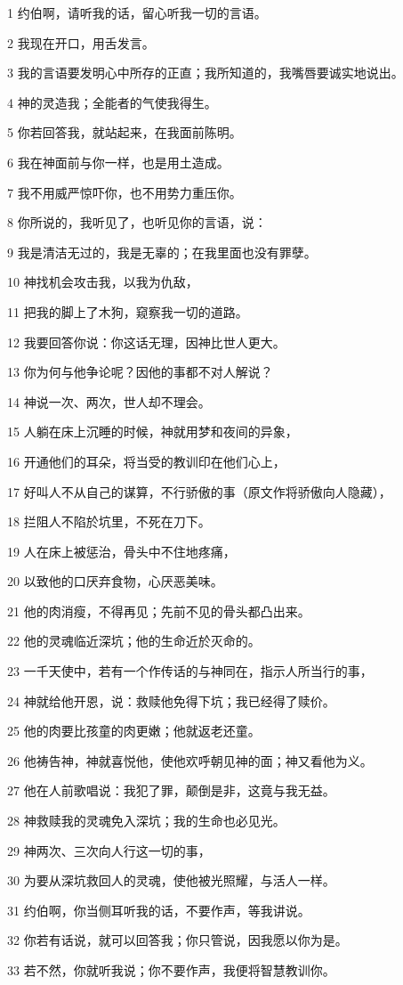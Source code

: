 \par 1 约伯啊，请听我的话，留心听我一切的言语。
\par 2 我现在开口，用舌发言。
\par 3 我的言语要发明心中所存的正直；我所知道的，我嘴唇要诚实地说出。
\par 4 神的灵造我；全能者的气使我得生。
\par 5 你若回答我，就站起来，在我面前陈明。
\par 6 我在神面前与你一样，也是用土造成。
\par 7 我不用威严惊吓你，也不用势力重压你。
\par 8 你所说的，我听见了，也听见你的言语，说：
\par 9 我是清洁无过的，我是无辜的；在我里面也没有罪孽。
\par 10 神找机会攻击我，以我为仇敌，
\par 11 把我的脚上了木狗，窥察我一切的道路。
\par 12 我要回答你说：你这话无理，因神比世人更大。
\par 13 你为何与他争论呢？因他的事都不对人解说？
\par 14 神说一次、两次，世人却不理会。
\par 15 人躺在床上沉睡的时候，神就用梦和夜间的异象，
\par 16 开通他们的耳朵，将当受的教训印在他们心上，
\par 17 好叫人不从自己的谋算，不行骄傲的事（原文作将骄傲向人隐藏），
\par 18 拦阻人不陷於坑里，不死在刀下。
\par 19 人在床上被惩治，骨头中不住地疼痛，
\par 20 以致他的口厌弃食物，心厌恶美味。
\par 21 他的肉消瘦，不得再见；先前不见的骨头都凸出来。
\par 22 他的灵魂临近深坑；他的生命近於灭命的。
\par 23 一千天使中，若有一个作传话的与神同在，指示人所当行的事，
\par 24 神就给他开恩，说：救赎他免得下坑；我已经得了赎价。
\par 25 他的肉要比孩童的肉更嫩；他就返老还童。
\par 26 他祷告神，神就喜悦他，使他欢呼朝见神的面；神又看他为义。
\par 27 他在人前歌唱说：我犯了罪，颠倒是非，这竟与我无益。
\par 28 神救赎我的灵魂免入深坑；我的生命也必见光。
\par 29 神两次、三次向人行这一切的事，
\par 30 为要从深坑救回人的灵魂，使他被光照耀，与活人一样。
\par 31 约伯啊，你当侧耳听我的话，不要作声，等我讲说。
\par 32 你若有话说，就可以回答我；你只管说，因我愿以你为是。
\par 33 若不然，你就听我说；你不要作声，我便将智慧教训你。

